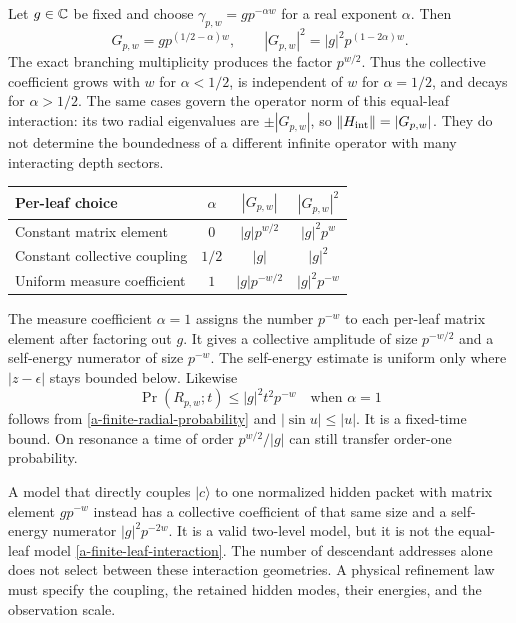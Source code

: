 Let $g\in\mathbb C$ be fixed and choose
$\gamma_{p,w}=g p^{-\alpha w}$ for a real exponent $\alpha$.
Then
\begin{equation}
 G_{p,w}=g p^{(1/2-\alpha)w},\qquad
 |G_{p,w}|^2=|g|^2p^{(1-2\alpha)w}.
 \label{a-finite-coupling-exponent}
\end{equation}
The exact branching multiplicity produces the factor $p^{w/2}$.
Thus the collective coefficient grows with $w$ for $\alpha<1/2$,
is independent of $w$ for $\alpha=1/2$, and decays for
$\alpha>1/2$. The same cases govern the operator norm of this
equal-leaf interaction: its two radial eigenvalues are
$\pm|G_{p,w}|$, so $\left\lVert H_{\mathrm{int}}\right\rVert=|G_{p,w}|$.
They do not determine the boundedness of a different infinite operator
with many interacting depth sectors.

\begin{center}
\begin{tabular}{@{}lccc@{}}
\toprule
Per-leaf choice & $\alpha$ & $|G_{p,w}|$ & $|G_{p,w}|^2$\\
\midrule
Constant matrix element & $0$ & $|g|p^{w/2}$ & $|g|^2p^w$\\
Constant collective coupling & $1/2$ & $|g|$ & $|g|^2$\\
Uniform measure coefficient & $1$ & $|g|p^{-w/2}$ & $|g|^2p^{-w}$\\
\bottomrule
\end{tabular}
\end{center}

The measure coefficient $\alpha=1$ assigns the number $p^{-w}$ to
each per-leaf matrix element after factoring out $g$. It gives a
collective amplitude of size $p^{-w/2}$ and a self-energy numerator of
size $p^{-w}$. The self-energy estimate is uniform only where
$|z-\epsilon|$ stays bounded below. Likewise
\[
 \Pr(R_{p,w};t)\leq |g|^2t^2p^{-w}
 \quad\text{when }\alpha=1
\]
follows from \eqref{a-finite-radial-probability} and
$|\sin u|\leq|u|$. It is a fixed-time bound. On resonance a time
of order $p^{w/2}/|g|$ can still transfer order-one probability.

A model that directly couples $|c\rangle$ to one normalized hidden
packet with matrix element $g p^{-w}$ instead has a collective
coefficient of that same size and a self-energy numerator
$|g|^2p^{-2w}$. It is a valid two-level model, but it is not the
equal-leaf model \eqref{a-finite-leaf-interaction}. The number of
descendant addresses alone does not select between these interaction
geometries. A physical refinement law must specify the coupling,
the retained hidden modes, their energies, and the observation scale.


